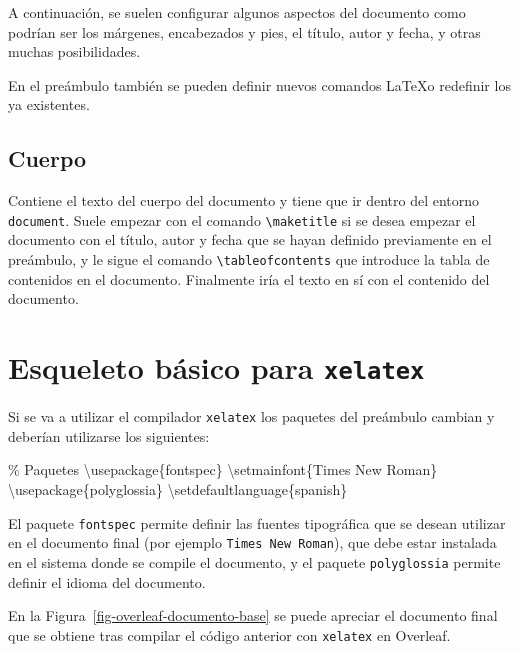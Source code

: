 \documentclass[
  a4paper,
]{scrreport}
\newenvironment{Shaded}{\begin{snugshade}}{\end{snugshade}}
\newcommand{\BuiltInTok}[1]{\textcolor[rgb]{0.00,0.23,0.31}{#1}}
\newcommand{\CommentTok}[1]{\textcolor[rgb]{0.37,0.37,0.37}{#1}}
\newcommand{\ExtensionTok}[1]{\textcolor[rgb]{0.00,0.23,0.31}{#1}}
\newcommand{\FunctionTok}[1]{\textcolor[rgb]{0.28,0.35,0.67}{#1}}
\newcommand{\NormalTok}[1]{\textcolor[rgb]{0.00,0.23,0.31}{#1}}
\theoremstyle{definition}
\theoremstyle{remark}
\begin{document}
A continuación, se suelen configurar algunos aspectos del documento como
podrían ser los márgenes, encabezados y pies, el título, autor y fecha,
y otras muchas posibilidades.

En el preámbulo también se pueden definir nuevos comandos \LaTeX o
redefinir los ya existentes.

\subsection{Cuerpo}\label{cuerpo}

Contiene el texto del cuerpo del documento y tiene que ir dentro del
entorno \texttt{document}. Suele empezar con el comando
\texttt{\textbackslash{}maketitle} si se desea empezar el documento con
el título, autor y fecha que se hayan definido previamente en el
preámbulo, y le sigue el comando
\texttt{\textbackslash{}tableofcontents} que introduce la tabla de
contenidos en el documento. Finalmente iría el texto en sí con el
contenido del documento.

\section{\texorpdfstring{Esqueleto básico para
\texttt{xelatex}}{Esqueleto básico para xelatex}}\label{esqueleto-buxe1sico-para-xelatex}

Si se va a utilizar el compilador \texttt{xelatex} los paquetes del
preámbulo cambian y deberían utilizarse los siguientes:

\begin{Shaded}
\begin{Highlighting}[]
\CommentTok{\% Paquetes}
\BuiltInTok{\textbackslash{}usepackage}\NormalTok{\{}\ExtensionTok{fontspec}\NormalTok{\}}
\FunctionTok{\textbackslash{}setmainfont}\NormalTok{\{Times New Roman\}}
\BuiltInTok{\textbackslash{}usepackage}\NormalTok{\{}\ExtensionTok{polyglossia}\NormalTok{\}}
\FunctionTok{\textbackslash{}setdefaultlanguage}\NormalTok{\{spanish\}}
\end{Highlighting}
\end{Shaded}

El paquete \texttt{fontspec} permite definir las fuentes tipográfica que
se desean utilizar en el documento final (por ejemplo
\texttt{Times\ New\ Roman}), que debe estar instalada en el sistema
donde se compile el documento, y el paquete \texttt{polyglossia} permite
definir el idioma del documento.

En la Figura~\ref{fig-overleaf-documento-base} se puede apreciar el
documento final que se obtiene tras compilar el código anterior con
\texttt{xelatex} en Overleaf.
\end{document}
